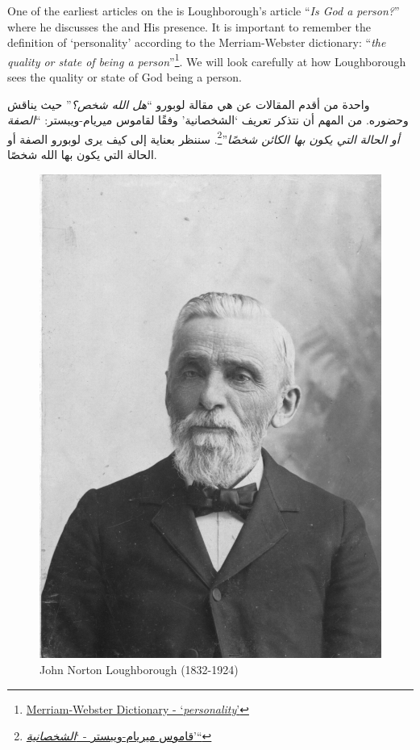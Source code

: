 



One of the earliest articles on the  is Loughborough’s article “\textit{Is God a person?}” where he discusses the  and His presence. It is important to remember the definition of ‘personality’ according to the Merriam-Webster dictionary: “\textit{the quality or state of being a person}”\footnote{\href{https://www.merriam-webster.com/dictionary/personality}{Merriam-Webster Dictionary - ‘\textit{personality}’}}. We will look carefully at how Loughborough sees the quality or state of God being a person.


واحدة من أقدم المقالات عن  هي مقالة لوبورو “\textit{هل الله شخص؟}” حيث يناقش  وحضوره. من المهم أن نتذكر تعريف ‘الشخصانية’ وفقًا لقاموس ميريام-ويبستر: “\textit{الصفة أو الحالة التي يكون بها الكائن شخصًا}”\footnote{\href{https://www.merriam-webster.com/dictionary/personality}{قاموس ميريام-ويبستر - ‘\textit{الشخصانية}’“}}. سننظر بعناية إلى كيف يرى لوبورو الصفة أو الحالة التي يكون بها الله شخصًا.


\begin{figure}[hp]
    \centering
    \includegraphics[width=1\linewidth]{images/john-n-loughborough.jpg}
    \caption*{John Norton Loughborough (1832-1924)}
    \label{fig:john-n-loughborough}
\end{figure}


